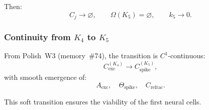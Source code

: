Then:
\[
  C_j \to \varnothing,
\qquad
  \Omega(K_5)=\varnothing,
\qquad
  k_5\to 0.
\]

\subsubsection{Continuity from \texorpdfstring{$K_4$}{K_4} to \texorpdfstring{$K_5$}{K_5}}

From Polish~W3 (memory~\#74), the transition is $C^1$-continuous:
\[
  C_{\mathrm{exc}}^{(K_4)}
   \longrightarrow
  C_{\mathrm{spike}}^{(K_5)},
\]
with smooth emergence of:
\[
  A_{\mathrm{exc}},\quad
  \Theta_{\mathrm{spike}},\quad
  C_{\mathrm{refrac}}.
\]

This soft transition ensures the viability of the first neural cells.
